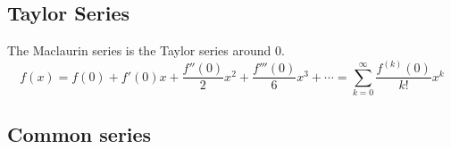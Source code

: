 \subsection{Taylor Series}

The Maclaurin series is the Taylor series around \(0\).
\begin{equation}
f(x) = f(0) + f'(0) x + \frac{f''(0)} 2 x^2 + \frac{f'''(0)}{6}x^3 +\dotsb
  = \sum_{k=0}^\infty \frac{f^{(k)}(0)}{k!}x^k
\end{equation}

\subsection{Common series}
